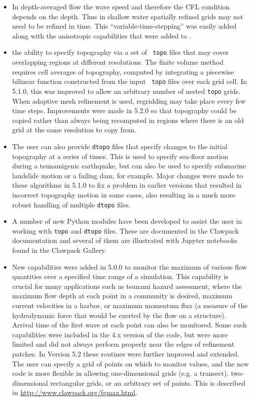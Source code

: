 \begin{itemize} 
\item In depth-averaged flow the wave speed and therefore the CFL condition depends on the depth.  Thus in shallow water spatially refined grids may not need to be refined in time.  This ``variable-time-stepping'' was easily added along with the anisotropic capabilities that were added to \amrclaw.

\item the ability to specify topography via a set of {\tt
topo} files that may cover overlapping regions at different resolutions. The
finite volume method requires cell averages of topography, computed by
integrating a piecewise bilinear function constructed from the input {\tt
topo} files over each grid cell.  In 5.1.0, this was improved to 
allow an arbitrary number of nested {\tt topo} grids.
When adaptive mesh refinement is used,
regridding may take place every few time steps.  Improvements were made 
in 5.2.0 so that topography could be copied rather than always being
recomputed in regions where there is an old grid at the same resolution to
copy from. 

\item The user can also provide {\tt dtopo} files that specify changes to the
initial topography at a series of times.  This is used to specify sea-floor
motion during a tsunamigenic earthquake, but can also be used to specify
submarine landslide motion or a failing dam, for example. Major changes were
made to these algorithms in 5.1.0 to fix a problem in earlier versions that
resulted in incorrect topography motion in some cases, also resulting in a much
more robust handling of multiple  {\tt dtopo} files.

\item A number of new Python modules have been developed to assist the user
in working with {\tt topo} and {\tt dtopo} files.  These are documented in
the Clawpack documentation and several of them are illustrated with Jupyter
notebooks found in the Clawpack Gallery.

\item New capabilities were added in 5.0.0 to monitor the maximum of various
flow quantities over a specified time range of a simulation.  This capability is
crucial for many applications such as tsunami hazard assessment, where the
maximum flow depth at each point in a community is desired, maximum current
velocities in a harbor, or maximum momentum flux (a measure of the hydrodynamic
force that would be exerted by the flow on a structure).  Arrival time of the
first wave at each point can also be monitored.  Some such capabilities were
included in the 4.x version of the code, but were more limited and did not
always perform properly near the edges of refinement patches.  
In Version 5.2 these routines were further improved and extended.  
The user can
specify a grid of points on which to monitor values, and the new code is more
flexible in allowing one-dimensional grids (e.g. a transect), two-dimensional
rectangular grids, or an arbitrary set of points.
This is described in 
\url{http://www.clawpack.org/fgmax.html}.

\end{itemize} 

